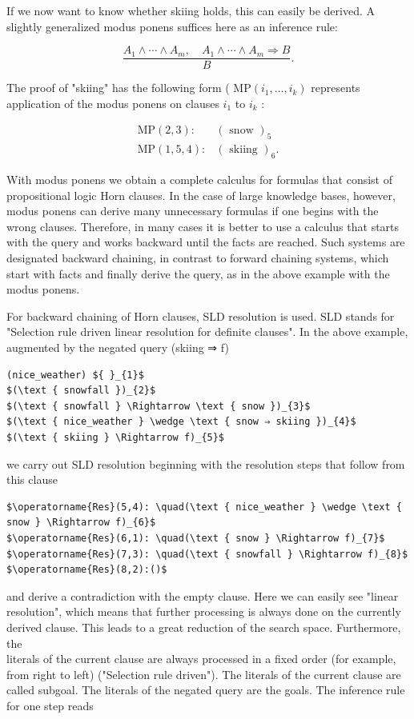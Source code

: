 \documentclass[10pt]{article}
\begin{document}
If we now want to know whether skiing holds, this can easily be derived. A slightly generalized modus ponens suffices here as an inference rule:

$$
\frac{A_{1} \wedge \cdots \wedge A_{m}, \quad A_{1} \wedge \cdots \wedge A_{m} \Rightarrow B}{B} .
$$

The proof of "skiing" has the following form ( $\mathrm{MP}\left(i_{1}, \ldots, i_{k}\right)$ represents application of the modus ponens on clauses $i_{1}$ to $i_{k}$ :

$$
\begin{array}{ll}
\mathrm{MP}(2,3): & (\text { snow })_{5} \\
\mathrm{MP}(1,5,4): & (\text { skiing })_{6} .
\end{array}
$$

With modus ponens we obtain a complete calculus for formulas that consist of propositional logic Horn clauses. In the case of large knowledge bases, however, modus ponens can derive many unnecessary formulas if one begins with the wrong clauses. Therefore, in many cases it is better to use a calculus that starts with the query and works backward until the facts are reached. Such systems are designated backward chaining, in contrast to forward chaining systems, which start with facts and finally derive the query, as in the above example with the modus ponens.

For backward chaining of Horn clauses, SLD resolution is used. SLD stands for "Selection rule driven linear resolution for definite clauses". In the above example, augmented by the negated query (skiing ⇒ f)

\begin{verbatim}
(nice_weather) ${ }_{1}$
$(\text { snowfall })_{2}$
$(\text { snowfall } \Rightarrow \text { snow })_{3}$
$(\text { nice_weather } \wedge \text { snow ⇒ skiing })_{4}$
$(\text { skiing } \Rightarrow f)_{5}$
\end{verbatim}

we carry out SLD resolution beginning with the resolution steps that follow from this clause

\begin{verbatim}
$\operatorname{Res}(5,4): \quad(\text { nice_weather } \wedge \text { snow } \Rightarrow f)_{6}$
$\operatorname{Res}(6,1): \quad(\text { snow } \Rightarrow f)_{7}$
$\operatorname{Res}(7,3): \quad(\text { snowfall } \Rightarrow f)_{8}$
$\operatorname{Res}(8,2):()$
\end{verbatim}

and derive a contradiction with the empty clause. Here we can easily see "linear resolution", which means that further processing is always done on the currently derived clause. This leads to a great reduction of the search space. Furthermore, the\\
literals of the current clause are always processed in a fixed order (for example, from right to left) ("Selection rule driven"). The literals of the current clause are called subgoal. The literals of the negated query are the goals. The inference rule for one step reads
\end{document}

